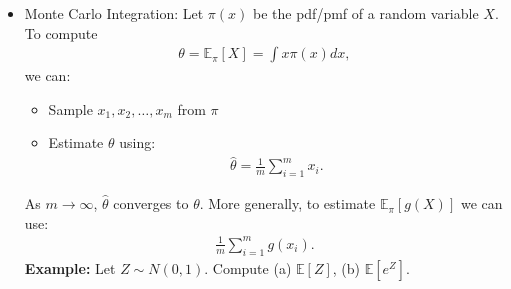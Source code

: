 \documentclass[11pt]{article}
\begin{document}
\begin{itemize}
\item Monte Carlo Integration: Let $\pi(x)$ be the pdf/pmf of a random variable $X$. To compute
\begin{align*}
 \theta = \mathbb{E}_{\pi}\left[X\right] = \int x \pi(x) dx ,
\end{align*}
we can:
\begin{itemize}
\item Sample $x_{1},x_{2},\ldots,x_{m}$ from $\pi$
\item Estimate $\theta$ using:
\begin{align*}
\hat{\theta} = \frac{1}{m}\sum_{i=1}^{m}x_{i} .
\end{align*}
\end{itemize}
As $m\rightarrow\infty$, $\hat{\theta}$ converges to $\theta$. More generally, to estimate $\mathbb{E}_{\pi}\left[g(X)\right]$ we can use:
\begin{align*}
\frac{1}{m}\sum_{i=1}^{m}g(x_{i}) .
\end{align*}
\textbf{Example:} Let $Z\sim{}N(0,1)$. Compute (a) $\mathbb{E}\left[Z\right]$, (b) $\mathbb{E}\left[e^{Z}\right]$. 


\end{itemize}
\end{document}
